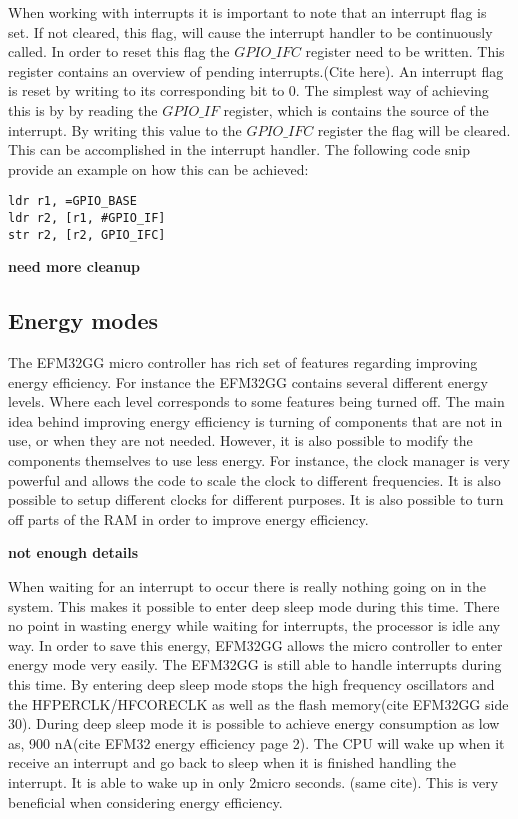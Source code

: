 When working with interrupts it is important to note that an interrupt flag is set. If not cleared, this flag, will cause the interrupt handler to be continuously called. In order to reset this flag the $GPIO\_IFC$ register need to be written. This register contains an overview of pending interrupts.(Cite here). An interrupt flag is reset by writing to its corresponding bit to 0.  The simplest way of achieving this is by by reading the $GPIO\_IF$ register, which is contains the source of the interrupt. By writing this value to the $GPIO\_IFC$ register the flag will be cleared.  This can be accomplished in the interrupt handler. The following code snip provide an example on how this can be achieved:

\begin{lstlisting}
ldr r1, =GPIO_BASE
ldr r2, [r1, #GPIO_IF]
str r2, [r2, GPIO_IFC]
\end{lstlisting}
 
{\bf need more cleanup}




\subsection{Energy modes}\label{ch:energy_modes} 
The EFM32GG micro controller has rich set of features regarding improving energy efficiency. For instance the EFM32GG contains several different energy levels. Where each level corresponds to some features being turned off. The main idea behind improving energy efficiency is turning of components that are not in use, or when they are not needed. However, it is also possible to modify the components themselves to use less energy. For instance, the clock manager is very powerful and allows the code to scale the clock to different frequencies. It is also possible to setup different clocks for different purposes. It is also possible to turn off parts of the RAM in order to improve energy efficiency. 

{\bf not enough details}


When waiting for an interrupt to occur there is really nothing going on in the system. This makes it possible to enter deep sleep mode during this time. There no point in wasting energy while waiting for interrupts, the processor is idle any way. In order to save this energy, EFM32GG allows the micro controller to enter energy mode very easily. The EFM32GG is still able to handle interrupts during this time. By entering deep sleep mode stops the high frequency oscillators and the HFPERCLK/HFCORECLK as well as the flash memory(cite EFM32GG side 30). During deep sleep mode it is possible to achieve energy consumption as low as, 900 nA(cite EFM32 energy efficiency page 2). The CPU will wake up when it receive an interrupt and go back to sleep when it is finished handling the interrupt. It is able to wake up in only 2micro seconds. (same cite). This is very beneficial when considering energy efficiency.   

